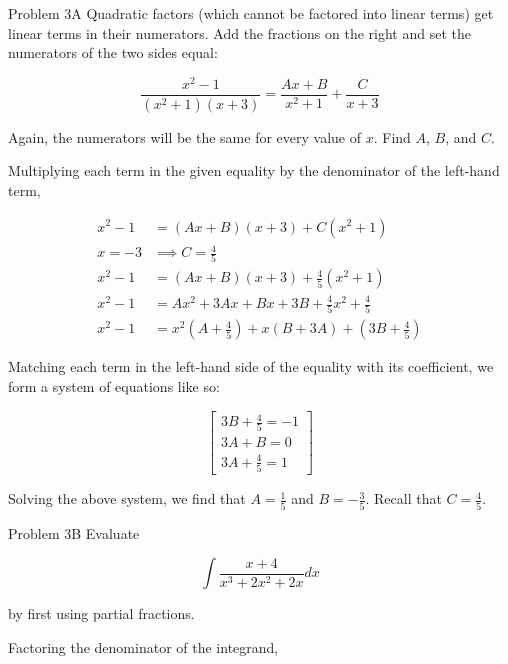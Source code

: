 \documentclass{article}
\begin{document}
    \begin{tbhtheorem}{Problem 3A}
        Quadratic factors (which cannot be factored into linear terms) get linear terms in their numerators. Add the fractions on the right and set the numerators of the two sides equal:

        \[
            \frac{x^2-1}{(x^2+1)(x+3)} = \frac{Ax+B}{x^2+1} + \frac{C}{x+3}
        \]

        Again, the numerators will be the same for every value of $x$. Find $A$, $B$, and $C$.
    \end{tbhtheorem}

    Multiplying each term in the given equality by the denominator of the left-hand term,

    \begin{align*}
        x^2-1   &= (Ax+B)(x+3) + C(x^2+1) \\
        x = -3  &\implies C = \frac{4}{5} \\
        x^2 - 1 &= (Ax+B)(x+3) + \frac{4}{5}(x^2+1) \\
        x^2 - 1 &= Ax^2 + 3Ax + Bx + 3B + \frac{4}{5}x^2 + \frac{4}{5} \\
        x^2 - 1 &= x^2\left(A + \frac{4}{5}\right) + x\left(B+3A\right) + \left(3B + \frac{4}{5}\right)
    \end{align*}

    \pagebreak
    \thispagestyle{4}

    Matching each term in the left-hand side of the equality with its coefficient, we form a system of equations like so:

    \[
        \begin{bmatrix}
            3B + \frac{4}{5} = -1 \\
            3A + B = 0          \\
            3A + \frac{4}{5} = 1
        \end{bmatrix}
    \]

    Solving the above system, we find that $A = \frac{1}{5}$ and $B=-\frac{3}{5}$. Recall that $C=\frac{4}{5}$.

    \begin{tbhtheorem}{Problem 3B}
        Evaluate

        \[
            \int \frac{x+4}{x^3+2x^2+2x}dx
        \]

        by first using partial fractions.
    \end{tbhtheorem}

    Factoring the denominator of the integrand,
\end{document}
